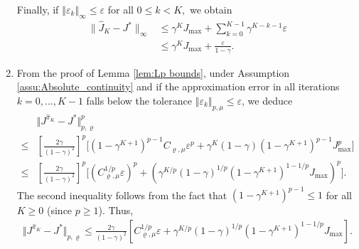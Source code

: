 \documentclass[12pt,technote,onecolumn]{IEEEtran}
\begin{document}
\begin{IEEEproof}
\begin{enumerate}
		Finally, if $\left\Vert \varepsilon_{k}\right\Vert _{\infty}\leq\varepsilon$
		for all $0\leq k<K,$ we obtain 
		\begin{equation*}
		\begin{aligned}
		\|\widehat{J}_{K}-J^{*}\|_{\infty}&\leq\gamma^{K}J_{\max}+\sum_{k=0}^{K-1}\gamma^{K-k-1}\varepsilon\\
		&\leq\gamma^{K}J_{\max}+\frac{\varepsilon}{1-\gamma}.
		\end{aligned}
		\end{equation*}
		\item From the proof of Lemma \ref{lem:Lp bounds}, under Assumption
		\ref{assu:Absolute_continuity} and if the approximation error in
		all\textbf{ }iterations $k=0,\dots,K-1$ falls below the tolerance
		$\left\Vert \varepsilon_{k}\right\Vert _{p,\mu}\leq\varepsilon$,
		we deduce
		\begin{equation*}
		\begin{aligned}
		&\Vert J^{\widehat{\pi}_{K}}-J^{*}\Vert _{p,\varrho}^{p}\\
		\leq & \left[\frac{2\gamma}{\left(1-\gamma\right)^{2}}\right]^{p}\big[(1-\gamma^{K+1})^{p-1}C_{\varrho,\mu}\varepsilon^{p}
		+\gamma^{K}(1-\gamma)(1-\gamma^{K+1})^{p-1}J_{\max}^{p}\big]\\
		\leq & \left[\frac{2\gamma}{(1-\gamma)^{2}}\right]^{p}\big[(C_{\varrho,\mu}^{1/p}\varepsilon)^{p}
		+(\gamma^{K/p}(1-\gamma)^{1/p}(1-\gamma^{K+1})^{1-1/p}J_{\max})^{p}\big].
		\end{aligned}
		\end{equation*}
		The second inequality follows from the fact that $(1-\gamma^{K+1})^{p-1}\leq1$
		for all $K\geq0$ (since $p\geq1$). Thus,
		\begin{equation*}
		\begin{aligned}
		\Vert J^{\widehat{\pi}_{K}}-J^{*}\Vert _{p,\varrho}
		\leq\frac{2\gamma}{(1-\gamma)^{2}}[C_{\varrho,\mu}^{1/p}\varepsilon
		+\gamma^{K/p}(1-\gamma)^{1/p}(1-\gamma^{K+1})^{1-1/p}J_{\max}].
		\end{aligned}
		\end{equation*}
	\end{enumerate}
\end{IEEEproof}
\end{document}
